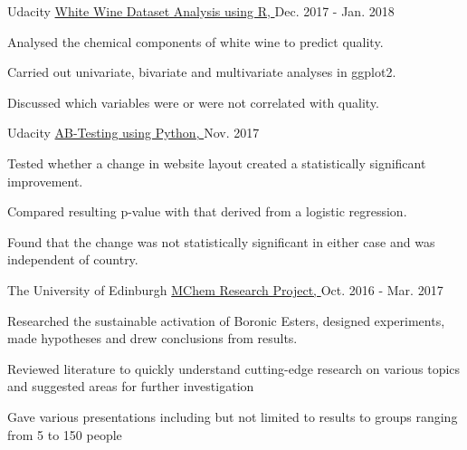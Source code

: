 

\begin{cventries}


  \cventry
    {Udacity} %
    {\href{https://github.com/SThornewillvE/Udacity-Project---Exploring-Wine-Data}{White Wine Dataset Analysis using R, }} %
    {} %
    {Dec. 2017 - Jan. 2018} %
    {
    \begin{cvitems} %
      \item {Analysed the chemical components of white wine to predict quality.}
      \item {Carried out univariate, bivariate and multivariate analyses in ggplot2.}
      \item {Discussed which variables were or were not correlated with quality.}
    \end{cvitems}
    }

  \cventry
    {Udacity} %
    {\href{https://github.com/SThornewillvE/Udacity-Project---AB-testing}{AB-Testing using Python, }} %
    {} %
    {Nov. 2017} %
    {
    \begin{cvitems} %
      \item {Tested whether a change in website layout created a statistically significant improvement.}
      \item {Compared resulting p-value with that derived from a logistic regression.}
      \item {Found that the change was not statistically significant in either case and was independent of country.}
    \end{cvitems}
    }

  \cventry
    {The University of Edinburgh} %
    {\href{https://www.evernote.com/shard/s234/sh/559f3e12-1aa6-4d68-a68b-3ddaf8526b9c/ccfcc1f7a32c8966587de6b8983877cb}{MChem Research Project, }} %
    {} %
    {Oct. 2016 - Mar. 2017} %
    {
    \begin{cvitems} %
      \item {Researched the sustainable activation of Boronic Esters, designed experiments, made hypotheses and drew conclusions from results.}
      \item {Reviewed literature to quickly understand cutting-edge research on various topics and suggested areas for further investigation}
      \item {Gave various presentations including but not limited to results to groups ranging from 5 to 150 people}
    \end{cvitems}
    }

\end{cventries}

